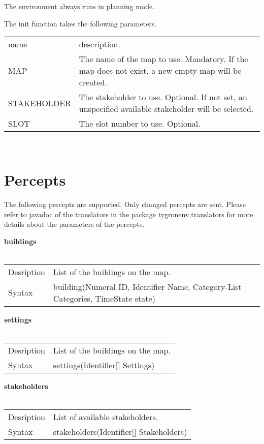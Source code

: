 \documentclass[english,11pt]{article}
\begin{document}
The environment always runs in planning mode.

The init function takes the following parameters. 

\begin{tabularx}{\textwidth}{lX}
 name & description. \\
 MAP & The name of the map to use.  Mandatory. If the map does not exist, a new empty map will be created. \\
 STAKEHOLDER & The stakeholder to use. Optional. If not set, an unspecified available stakeholder will be selected. \\
 SLOT &  The slot number to use.  Optional.  \\
\end{tabularx}\\


\section{Percepts}

The following percepts are supported. Only changed percepts are sent. Please refer to javadoc of the translators in the package tygronenv.translators for more details about the parameters of the percepts.
\newline


\textbf{buildings}\\
\\
\begin{tabularx}{\textwidth}{lX}
 Desription & List of the buildings on the map. \\
 Syntax & building(Numeral ID, Identifier Name, Category-List Categories, TimeState state) \\
\end{tabularx}
\newline

\textbf{settings}\\
\\
\begin{tabularx}{\textwidth}{lX}
 Desription & List of the buildings on the map. \\
 Syntax & settings(Identifier[] Settings) \\
\end{tabularx}
\newline

\textbf{stakeholders}\\
\\
\begin{tabularx}{\textwidth}{lX}
 Desription & List of available stakeholders. \\
 Syntax & stakeholders(Identifier[] Stakeholders) \\
\end{tabularx}
\newline
\end{document}
